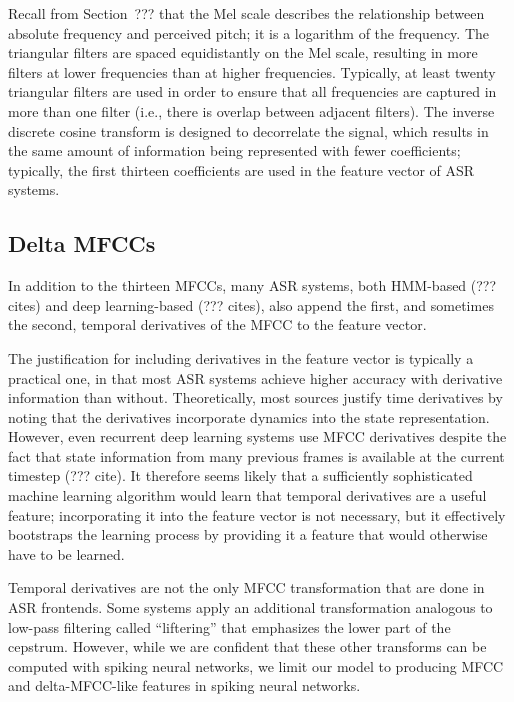 Recall from Section~??? that the Mel scale
describes the relationship between
absolute frequency and perceived pitch;
it is a logarithm of the frequency.
The triangular filters are spaced
equidistantly on the Mel scale,
resulting in more filters
at lower frequencies than at higher frequencies.
Typically, at least twenty triangular filters
are used in order to ensure that all frequencies
are captured in more than one filter
(i.e., there is overlap between adjacent filters).
The inverse discrete cosine transform
is designed to decorrelate the signal,
which results in the same amount
of information being represented
with fewer coefficients;
typically, the first thirteen coefficients
are used in the feature vector
of ASR systems.

\subsection{Delta MFCCs}

In addition to the thirteen MFCCs,
many ASR systems,
both HMM-based (??? cites)
and deep learning-based (??? cites),
also append the first,
and sometimes the second,
temporal derivatives of the MFCC
to the feature vector.

The justification for including derivatives
in the feature vector is typically
a practical one,
in that most ASR systems
achieve higher accuracy with
derivative information than without.
Theoretically,
most sources justify time derivatives
by noting that the derivatives
incorporate dynamics into the state representation.
However,
even recurrent deep learning systems
use MFCC derivatives
despite the fact that
state information from many previous frames
is available at the current timestep
(??? cite).
It therefore seems likely that
a sufficiently sophisticated machine learning algorithm
would learn that temporal derivatives
are a useful feature;
incorporating it into the feature vector
is not necessary,
but it effectively bootstraps the learning process
by providing it a feature
that would otherwise
have to be learned.

Temporal derivatives are not the only
MFCC transformation that are done in ASR frontends.
Some systems apply an additional transformation
analogous to low-pass filtering
called ``liftering'' that emphasizes
the lower part of the cepstrum.
However, while we are confident
that these other transforms
can be computed with spiking neural networks,
we limit our model to producing
MFCC and delta-MFCC-like features
in spiking neural networks.

